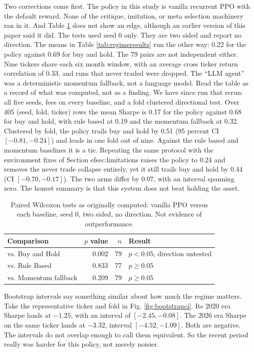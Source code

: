 \documentclass[conference]{IEEEtran}
\begin{document}
Two corrections come first. The policy in this study is vanilla recurrent PPO with the default reward. None of the critique, imitation, or meta selection machinery ran in it. And Table \ref{tab:significance} does not show an edge, although an earlier version of this paper said it did. The tests used seed 0 only. They are two sided and report no direction. The means in Table \ref{tab:regimeresults} run the other way: 0.22 for the policy against 0.69 for buy and hold. The 79 pairs are not independent either. Nine tickers share each six month window, with an average cross ticker return correlation of 0.33, and runs that never traded were dropped. The ``LLM agent'' was a deterministic momentum fallback, not a language model. Read the table as a record of what was computed, not as a finding. We have since run that rerun: all five seeds, fees on every baseline, and a fold clustered directional test. Over 405 (seed, fold, ticker) rows the mean Sharpe is 0.17 for the policy against 0.68 for buy and hold, with rule based at 0.19 and the momentum fallback at 0.32. Clustered by fold, the policy trails buy and hold by 0.51 (95 percent CI $[-0.81, -0.24]$) and leads in one fold out of nine. Against the rule based and momentum baselines it is a tie. Repeating the same protocol with the environment fixes of Section 
ef{sec:limitations} raises the policy to 0.24 and removes the never trade collapse entirely, yet it still trails buy and hold by 0.44 (CI $[-0.70, -0.17]$). The two arms differ by 0.07, with an interval spanning zero. The honest summary is that this system does not beat holding the asset.

\begin{table}[t]
\caption{Paired Wilcoxon tests as originally computed: vanilla PPO versus each baseline, seed 0, two sided, no direction. Not evidence of outperformance.}
\label{tab:significance}
\centering
\begin{tabular}{lrrl}
\toprule
Comparison & $p$ value & $n$ & Result \\
\midrule
vs. Buy and Hold & 0.002 & 79 & $p<0.05$, direction untested \\
vs. Rule Based & 0.833 & 77 & $p \geq 0.05$ \\
vs. Momentum fallback & 0.209 & 79 & $p \geq 0.05$ \\
\bottomrule
\end{tabular}
\end{table}

Bootstrap intervals say something similar about how much the regime matters. Take the representative ticker and fold in Fig. \ref{fig:bootstrapci}. Its 2020 era Sharpe lands at $-1.25$, with an interval of $[-2.45, -0.08]$. The 2026 era Sharpe on the same ticker lands at $-3.32$, interval $[-4.52, -1.09]$. Both are negative. The intervals do not overlap enough to call them equivalent. So the recent period really was harder for this policy, not merely noisier.
\end{document}
